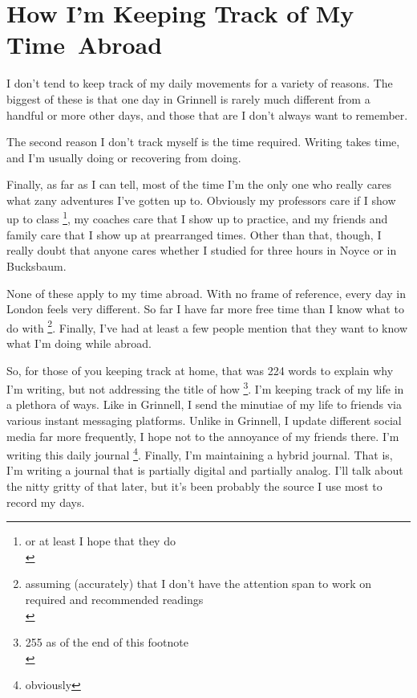 \hypertarget{how-im-keeping-track-of-my-time-abroad.html}{%
\section{How I'm Keeping Track of My
Time~Abroad}\label{how-im-keeping-track-of-my-timeabroad}}

I don't tend to keep track of my daily movements for a variety of
reasons. The biggest of these is that one day in Grinnell is rarely much
different from a handful or more other days, and those that are I don't
always want to remember.

The second reason I don't track myself is the time required. Writing
takes time, and I'm usually doing or recovering from doing.

Finally, as far as I can tell, most of the time I'm the only one who
really cares what zany adventures I've gotten up to. Obviously my
professors care if I show up to class \footnote{or at least I hope that
  they do\\}, my coaches care that I show up to practice, and my friends
and family care that I show up at prearranged times. Other than that,
though, I really doubt that anyone cares whether I studied for three
hours in Noyce or in Bucksbaum.

None of these apply to my time abroad. With no frame of reference, every
day in London feels very different. So far I have far more free time
than I know what to do with \footnote{assuming (accurately) that I don't
  have the attention span to work on required and recommended readings\\}.
Finally, I've had at least a few people mention that they want to know
what I'm doing while abroad.

So, for those of you keeping track at home, that was 224 words to
explain why I'm writing, but not addressing the title of how \footnote{255
  as of the end of this footnote\\}. I'm keeping track of my life in a
plethora of ways. Like in Grinnell, I send the minutiae of my life to
friends via various instant messaging platforms. Unlike in Grinnell, I
update different social media far more frequently, I hope not to the
annoyance of my friends there. I'm writing this daily journal \footnote{obviously}.
Finally, I'm maintaining a hybrid journal. That is, I'm writing a
journal that is partially digital and partially analog. I'll talk about
the nitty gritty of that later, but it's been probably the source I use
most to record my days.
